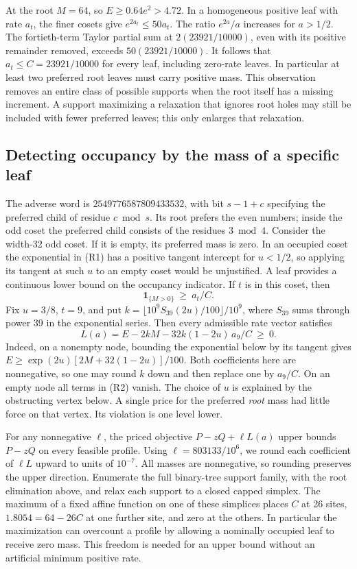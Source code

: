 At the root \(M=64\), so \(E\ge0.64e^2>4.72\). In a homogeneous positive leaf with rate \(a_t\), the finer cosets give \(e^{2a_t}\le50a_t\). The ratio \(e^{2a}/a\) increases for \(a>1/2\). The fortieth-term Taylor partial sum at \(2(23921/10000)\), even with its positive remainder removed, exceeds \(50(23921/10000)\). It follows that \(a_t\le C=23921/10000\) for every leaf, including zero-rate leaves. In particular at least two preferred root leaves must carry positive mass. This observation removes an entire class of possible supports when the root itself has a missing increment. A support maximizing a relaxation that ignores root holes may still be included with fewer preferred leaves; this only enlarges that relaxation.

\subsection{Detecting occupancy by the mass of a specific leaf}

The adverse word is \(2549776587809433532\), with bit \(s-1+c\) specifying the preferred child of residue \(c\bmod s\). Its root prefers the even numbers; inside the odd coset the preferred child consists of the residues \(3\bmod4\). Consider the width-32 odd coset. If it is empty, its preferred mass is zero. In an occupied coset the exponential in (R1) has a positive tangent intercept for \(u<1/2\), so applying its tangent at such \(u\) to an empty coset would be unjustified. A leaf provides a continuous lower bound on the occupancy indicator. If \(t\) is in this coset, then
\[
 \mathbf1_{\{M>0\}}\ \ge\ a_t/C.
\]
Fix \(u=3/8\), \(t=9\), and put \(k=\lfloor 10^9 S_{39}(2u)/100\rfloor/10^9\), where \(S_{39}\) sums through power 39 in the exponential series. Then every admissible rate vector satisfies
\[
 L(a)= E-2kM-32k(1-2u)\,a_9/C\ \ge\ 0.
 \tag{R2}
\]
Indeed, on a nonempty node, bounding the exponential below by its tangent gives \(E\ge \exp(2u)[2M+32(1-2u)]/100\). Both coefficients here are nonnegative, so one may round \(k\) down and then replace one by \(a_9/C\). On an empty node all terms in (R2) vanish. The choice of \(u\) is explained by the obstructing vertex below. A single price for the preferred \emph{root} mass had little force on that vertex. Its violation is one level lower.

For any nonnegative \(\ell\), the priced objective \(P-zQ+\ell L(a)\) upper bounds \(P-zQ\) on every feasible profile. Using \(\ell=803133/10^6\), we round each coefficient of \(\ell L\) upward to units of \(10^{-7}\). All masses are nonnegative, so rounding preserves the upper direction. Enumerate the full binary-tree support family, with the root elimination above, and relax each support to a closed capped simplex. The maximum of a fixed affine function on one of these simplices places \(C\) at 26 sites, \(1.8054=64-26C\) at one further site, and zero at the others. In particular the maximization can overcount a profile by allowing a nominally occupied leaf to receive zero mass. This freedom is needed for an upper bound without an artificial minimum positive rate.

